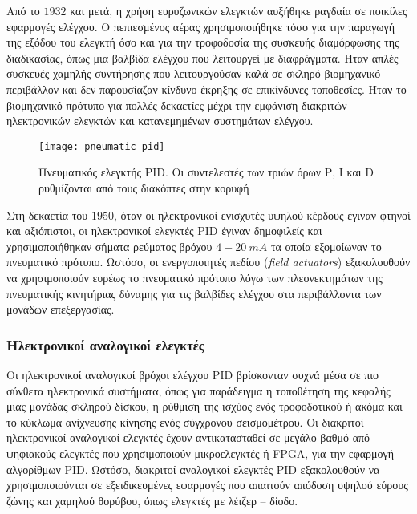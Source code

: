 Από το $1932$ και μετά, η χρήση ευρυζωνικών ελεγκτών αυξήθηκε ραγδαία σε ποικίλες εφαρμογές ελέγχου. Ο πεπιεσμένος αέρας χρησιμοποιήθηκε τόσο για την παραγωγή της εξόδου του ελεγκτή όσο και για την τροφοδοσία της συσκευής διαμόρφωσης της διαδικασίας, όπως μια βαλβίδα ελέγχου που λειτουργεί με διαφράγματα. Ήταν απλές συσκευές χαμηλής συντήρησης που λειτουργούσαν καλά σε σκληρό βιομηχανικό περιβάλλον και δεν παρουσίαζαν κίνδυνο έκρηξης σε επικίνδυνες τοποθεσίες. Ήταν το βιομηχανικό πρότυπο για πολλές δεκαετίες μέχρι την εμφάνιση διακριτών ηλεκτρονικών ελεγκτών και κατανεμημένων συστημάτων ελέγχου.

\begin{figure}[h]
  \centering
  \texttt{[image: pneumatic\_pid]}
  \caption{Πνευματικός ελεγκτής PID. Οι συντελεστές των τριών όρων Ρ, Ι και D ρυθμίζονται από τους διακόπτες στην κορυφή}
  \label{fig:pneumatic_pid}
\end{figure}

Στη δεκαετία του $1950$, όταν οι ηλεκτρονικοί ενισχυτές υψηλού κέρδους έγιναν φτηνοί και αξιόπιστοι, οι ηλεκτρονικοί ελεγκτές PID έγιναν δημοφιλείς και χρησιμοποιήθηκαν σήματα ρεύματος βρόχου $4 - 20\ mA$ τα οποία εξομοίωναν το πνευματικό πρότυπο. Ωστόσο, οι ενεργοποιητές πεδίου (\emph{field actuators}) εξακολουθούν να χρησιμοποιούν ευρέως το πνευματικό πρότυπο λόγω των πλεονεκτημάτων της πνευματικής κινητήριας δύναμης για τις βαλβίδες ελέγχου στα περιβάλλοντα των μονάδων επεξεργασίας.

\subsubsection{Ηλεκτρονικοί αναλογικοί ελεγκτές}
Οι ηλεκτρονικοί αναλογικοί βρόχοι ελέγχου PID βρίσκονταν συχνά μέσα σε πιο σύνθετα ηλεκτρονικά συστήματα, όπως για παράδειγμα η τοποθέτηση της κεφαλής μιας μονάδας σκληρού δίσκου, η ρύθμιση της ισχύος ενός τροφοδοτικού ή ακόμα και το κύκλωμα ανίχνευσης κίνησης ενός σύγχρονου σεισμομέτρου. Οι διακριτοί ηλεκτρονικοί αναλογικοί ελεγκτές έχουν αντικατασταθεί σε μεγάλο βαθμό από ψηφιακούς ελεγκτές που χρησιμοποιούν μικροελεγκτές ή FPGA, για την εφαρμογή αλγορίθμων PID. Ωστόσο, διακριτοί αναλογικοί ελεγκτές PID εξακολουθούν να χρησιμοποιούνται σε εξειδικευμένες εφαρμογές που απαιτούν απόδοση υψηλού εύρους ζώνης και χαμηλού θορύβου, όπως ελεγκτές με λέιζερ -- δίοδο. 


